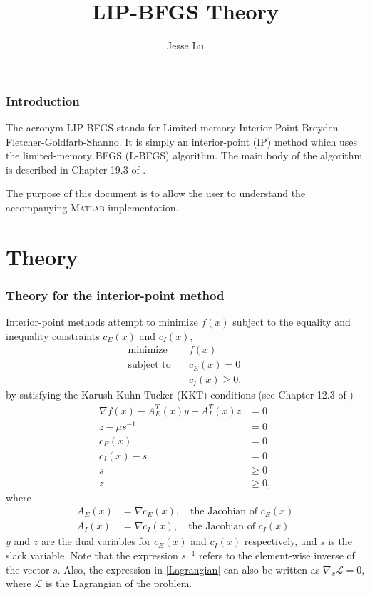 \documentclass{article}
\begin{document}
\title{LIP-BFGS Theory}
\author{Jesse Lu}
\maketitle
\tableofcontents

\section{Introduction}
The acronym LIP-BFGS stands for 
  Limited-memory Interior-Point Broyden-Fletcher-Goldfarb-Shanno.
It is simply an interior-point (IP) method which uses the 
  limited-memory BFGS (L-BFGS) algorithm.
The main body of the algorithm is described in Chapter 19.3 of \cite{NW04}.

The purpose of this document is 
  to allow the user to understand the accompanying \textsc{Matlab} 
  implementation.

\part{Theory}
\section{Theory for the interior-point method}
Interior-point methods attempt to minimize $f(x)$ 
    subject to the equality and inequality constraints $c_E(x)$ and $c_I(x)$,
\begin{subequations}
\begin{align}
\text{minimize} \quad & f(x) \\
\text{subject to} \quad & c_E(x) = 0 \\
                        & c_I(x) \ge 0,
\end{align}
\end{subequations}
    by satisfying the Karush-Kuhn-Tucker (KKT) conditions
    (see Chapter 12.3 of \cite{NW04})
\begin{subequations}\begin{align}
    \nabla f(x) - A_E^T(x) y - A_I^T(x) z &= 0 \label{Lagrangian} \\
    z - \mu s^{-1} &= 0 \\
    c_E(x) &= 0 \\
    c_I(x) - s &= 0 \\
    s &\ge 0 \\
    z &\ge 0,
\end{align}\end{subequations}
    where
\begin{subequations}\begin{align}
    A_E(x) &= \nabla c_E(x), \quad\text{the Jacobian of $c_E(x)$} \\
    A_I(x) &= \nabla c_I(x), \quad\text{the Jacobian of $c_I(x)$} 
\end{align}\end{subequations}
    $y$ and $z$ are the dual variables for $c_E(x)$ and $c_I(x)$ respectively,
    and $s$ is the slack variable.
Note that the expression $s^{-1}$ 
    refers to the element-wise inverse of the vector $s$.
Also, the expression in \eqref{Lagrangian} can also be written as
    $\nabla_x \mathcal{L} = 0$, 
    where $\mathcal{L}$ is the Lagrangian of the problem.
\end{document}
